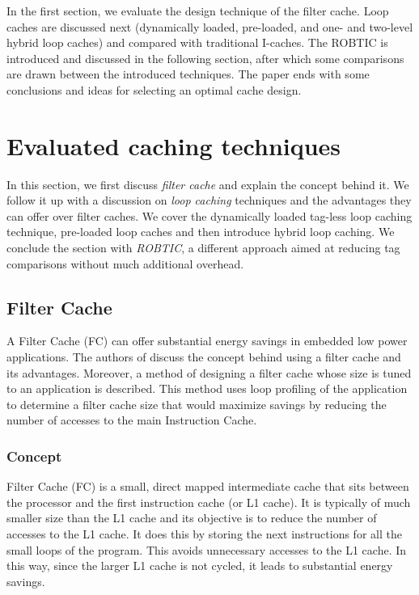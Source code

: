 \documentclass[conference]{IEEEtran}
\begin{document}
In the first section, we evaluate the design technique of the filter cache. Loop caches are discussed next (dynamically loaded, pre-loaded, and one- and two-level hybrid loop caches) and compared with traditional I-caches. The ROBTIC is introduced and discussed in the following section, after which some comparisons are drawn between the introduced techniques. The paper ends with some conclusions and ideas for selecting an optimal cache design.

\section{Evaluated caching techniques}

In this section, we first discuss \textit{filter cache} and explain the concept behind it. We follow it up with a discussion on \textit{loop caching} techniques and the advantages they can offer over filter caches. We cover the dynamically loaded tag-less loop caching technique, pre-loaded loop caches and then introduce hybrid loop caching. We conclude the section with \textit{ROBTIC}, a different approach aimed at reducing tag comparisons without much additional overhead.

\subsection{Filter Cache}

	A Filter Cache (FC) can offer substantial energy savings in embedded low power applications. The authors of \cite{fc1} discuss the concept behind using a filter cache and its advantages. Moreover, a method of designing a filter cache whose size is tuned to an application is described. This method uses loop profiling of the application to determine a filter cache size that would maximize savings by reducing the number of accesses to the main Instruction Cache.
	
	\subsubsection{Concept}
	Filter Cache (FC) is a small, direct mapped intermediate cache that sits between the processor and the first instruction cache (or L1 cache). It is typically of much smaller size than the L1 cache and its objective is to reduce the number of accesses to the L1 cache. It does this by storing the next instructions for all the small loops of the program. This avoids unnecessary accesses to the L1 cache. In this way, since the larger L1 cache is not cycled, it leads to substantial energy savings.
	
\end{document}
